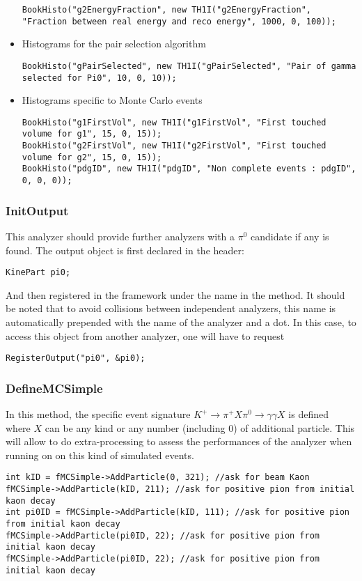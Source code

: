 \begin{itemize}
\begin{lstlisting}
BookHisto("g2EnergyFraction", new TH1I("g2EnergyFraction", "Fraction between real energy and reco energy", 1000, 0, 100));
\end{lstlisting}
	\item Histograms for the pair selection algorithm
\begin{lstlisting}
BookHisto("gPairSelected", new TH1I("gPairSelected", "Pair of gamma selected for Pi0", 10, 0, 10));
\end{lstlisting}
	\item Histograms specific to Monte Carlo events
\begin{lstlisting}
BookHisto("g1FirstVol", new TH1I("g1FirstVol", "First touched volume for g1", 15, 0, 15));
BookHisto("g2FirstVol", new TH1I("g2FirstVol", "First touched volume for g2", 15, 0, 15));
BookHisto("pdgID", new TH1I("pdgID", "Non complete events : pdgID", 0, 0, 0));
\end{lstlisting}
\end{itemize}

\subsubsection{InitOutput}
This analyzer should provide further analyzers with a $\pi^0$ candidate if any is found. The output
object is first declared in the header:

\begin{lstlisting}
KinePart pi0;
\end{lstlisting}

And then registered in the framework under the name  in the 
method. It should be noted that to avoid collisions between independent analyzers, this name is
automatically prepended with the name of the analyzer and a dot. In this case, to access this
object from another analyzer, one will have to request 
\begin{lstlisting}
RegisterOutput("pi0", &pi0);
\end{lstlisting}

\subsubsection{DefineMCSimple}
In this method, the specific event signature $K^+\to\pi^+X\pi^0\to\gamma\gamma X$ is defined where
$X$ can be any kind or any number (including 0) of additional particle. This will allow to do
extra-processing to assess the performances of the analyzer when running on on this kind of
simulated events.
\begin{lstlisting}
int kID = fMCSimple->AddParticle(0, 321); //ask for beam Kaon
fMCSimple->AddParticle(kID, 211); //ask for positive pion from initial kaon decay
int pi0ID = fMCSimple->AddParticle(kID, 111); //ask for positive pion from initial kaon decay
fMCSimple->AddParticle(pi0ID, 22); //ask for positive pion from initial kaon decay
fMCSimple->AddParticle(pi0ID, 22); //ask for positive pion from initial kaon decay
\end{lstlisting}


